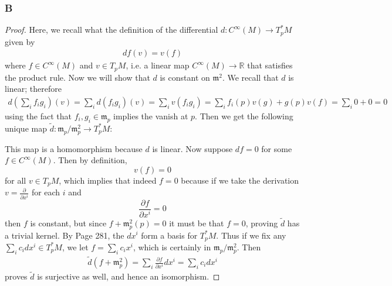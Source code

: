 \documentclass{article}
\newcommand{\R}{\mathbb{R}}
\newcommand{\frkm}{\mathfrak{m}}
\begin{document}
\subsubsection{B}\label{2.1.B}
\begin{proof}
    Here, we recall what the definition of the differential $d:C^\infty (M)\to T_p^*M$ given by
    \begin{align*}
        df(v)=v(f)
    \end{align*}
    where $f\in C^\infty (M)$ and $v\in T_p M$, i.e. a linear map $C^\infty(M)\to \R$ that satisfies the product rule. Now we will show that $d$ is constant on $\mathfrak{m}^2$. We recall that $d$ is linear; therefore
    \begin{align*}
        d(\sum_i f_ig_i)(v)=\sum_i d(f_ig_i)(v)=\sum_i v(f_ig_i)=\sum_i f_i(p) v(g)+g(p)v(f)=\sum_i 0+0=0
    \end{align*}
    using the fact that $f_i,g_i\in \frkm_p$ implies the vanish at $p$. Then we get the following unique map $\tilde d:\frkm_p/\frkm_p^2\to T^*_pM$:
    \begin{center}
    \end{center}
    This map is a homomorphism because $d$ is linear. Now suppose $df=0$ for some $f\in C^\infty(M)$. Then by definition,
    \[
    v(f)=0
    \]
    for all $v\in T_pM$, which implies that indeed $f=0$ because if we take the derivation $v=\frac{\partial}{\partial x^i}$ for each $i$ and 
    \[
    \frac{\partial f}{\partial x^i}=0
    \]
    then $f$ is constant, but since $f+\frkm_p^2(p)=0$ it must be that $f=0$, proving $\tilde d$ has a trivial kernel. By \cite{Lee_Manifolds} Page 281, the $dx^i$ form a basis for $T_p^*M$. Thus if we fix any $\sum_i c_i dx^i\in T_p^*M$, we let $f=\sum_i c_i x^i$, which is certainly in $\frkm_p/\frkm_p^2$. Then
    \begin{align*}
        \tilde d(f+\frkm_p^2)=\sum_i\frac{\partial f}{\partial x^i} dx^i=\sum_i c_i dx^i
    \end{align*}
    proves $\tilde d$ is surjective as well, and hence an isomorphism.
\end{proof}
\subsection{}
\end{document}
